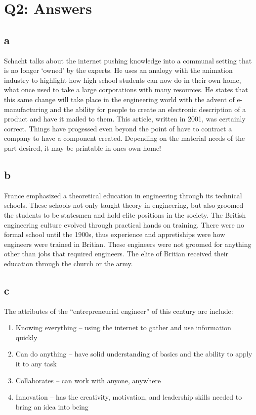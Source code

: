 \documentclass[12pt]{article} %
\begin{document}
\section{Q2: Answers}

	\subsection{a}
		Schacht talks about the internet pushing knowledge into a communal setting that is no longer ‘owned’ by the experts. He uses an analogy with the animation industry to highlight how high school students can now do in their own home, what once used to take a large corporations with many resources. He states that this same change will take place in the engineering world with the advent of e-manufacturing and the ability for people to create an electronic description of a product and have it mailed to them. This article, written in 2001, was certainly correct. Things have progessed even beyond the point of have to contract a company to have a component created. Depending on the material needs of the part desired, it may be printable in ones own home!

	\subsection{b}
		France emphasized a theoretical education in engineering through its technical schools. These schools not only taught theory in engineering, but also groomed the students to be statesmen and hold elite positions in the society. The British engineering culture evolved through practical hands on training. There were no formal school until the 1900s, thus experience and appretiships were how engineers were trained in Britian. These engineers were not groomed for anything other than jobs that required engineers. The elite of Britian received their education through the church or the army. 

	\subsection{c}
		The attributes of the “entrepreneurial engineer” of this century are include:
		\begin{enumerate}
			\item Knowing everything – using the internet to gather and use information quickly
			\item Can do anything – have solid understanding of basics and the ability to apply it to any task
			\item Collaborates – can work with anyone, anywhere
			\item Innovation – has the creativity, motivation, and leadership skills needed to bring an idea into being
		\end{enumerate}
\end{document}
